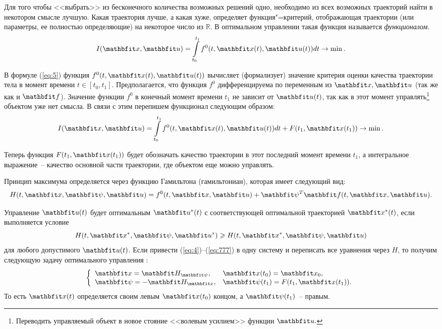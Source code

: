 \documentclass[a4paper,14pt, openany, twoside, final]{extbook} %
\begin{document}
Для того чтобы <<выбрать>> из бесконечного количества возможных решений одно, необходимо из всех возможных траекторий найти в некотором смысле лучшую.  Какая траектория лучше, а какая хуже, определяет функция"=критерий, отображающая траектории (или параметры, ее полностью определяющие) на некоторое число из $\mathbb{R}$.  В оптимальном управлении такая функция называется \emph{функционалом}.
\begin{equation}
  \label{eq:5}
  I(\vecx,\vecu)=\int\limits_{t_0}^{t_1}f^0(t,\vecx(t),\vecu(t))dt \to \min.
\end{equation}

В формуле (\ref{eq:5}) функция $f^0(t,\vecx(t),\vecu(t))$ вычисляет (формализует) значение критерия оценки качества траектории тела в момент времени $t\in[t_0,t_1]$.  Предполагается, что функция $f^0$ дифференцируема по переменным из $\vecx,\vecu$ (так же как и $\vecf$).  Значение функции $f^0$ в конечный момент времени $t_1$ не зависит от $\vecu(t)$, так как в этот момент управлять\footnote{Переводить управляемый объект в новое стояние <<волевым усилием>> функции $\vecu.$} объектом уже нет смысла.  В связи с этим перепишем функционал следующим образом:
\begin{equation}
  \label{eq:6}
  I(\vecx,\vecu)=\int\limits_{t_0}^{t_1}f^0(t,\vecx(t),\vecu(t))dt+F(t_1,\vecx(t_1)) \to \min.
\end{equation}

\noindent{}Теперь функция $F(t_1,\vecx(t_1))$ будет обозначать качество траектории в этот последний момент времени $t_1$, а интегральное выражение~-- качество основной части траектории, где объектом еще можно управлять.

Принцип максимума определяется через функцию Гамильтона (гамильтониан), которая имеет следующий вид:
\begin{equation}
  \label{eq:7}
  H(t,\vecx,\vecpsi,\vecu)=f^0(t,\vecx,\vecu)+\vecpsi^T\vecf(t,\vecx,\vecu).
\end{equation}

Управление $\vecu(t)$ будет оптимальным $\vecu^*(t)$ с соответствующей оптимальной траекторией $\vecx^*(t)$, если выполняется условие
\begin{equation}
  \label{eq:777}
  H(t,\vecx^*,\vecpsi,\vecu^*)\geqslant H(t,\vecx^*,\vecpsi,\vecu)
\end{equation}
для любого допустимого $\vecu(t)$.  Если привести (\ref{eq:4})--(\ref{eq:777}) в одну систему и переписать все уравнения через $H$, то получим следующую задачу оптимального управления \cite{sethi}:
\begin{equation}
  \label{eq:8}
  \left\{
    \begin{array}{ll}
      \dot{\vecx}=\vecH_{\vecpsi}, & \vecx(t_0)=\vecx_0,\\
      \dot{\vecpsi}=-\vecH_{\vecx}, & \vecpsi(t_1)=F(t_1,\vecx(t_1)).
    \end{array}
  \right.
\end{equation}
То есть $\vecx(t)$ определяется своим левым $\vecx(t_0)$ концом, а $\vecpsi(t_1)$~-- правым.
\end{document}
